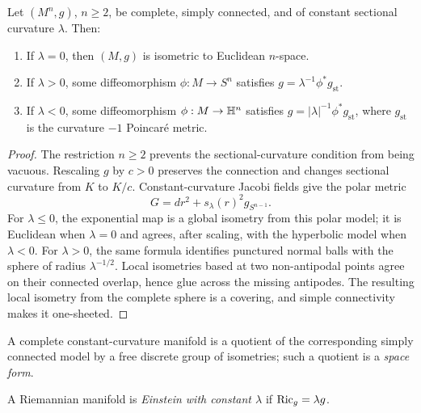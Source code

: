\begin{theorem}
\label{thm:uniformization}

Let $(M^n,g)$, $n\ge2$, be complete, simply connected, and of constant
sectional curvature $\lambda$. Then:
\begin{enumerate}
\item If $\lambda=0$, then $(M,g)$ is isometric to Euclidean
  $n$-space.
\item If $\lambda>0$, some diffeomorphism $\phi:M\to S^n$ satisfies
  $g=\lambda^{-1}\phi^*g_{\mathrm{st}}$.
\item If $\lambda<0$, some diffeomorphism $\phi:M\to\mathbb{H}^n$ satisfies
  $g=|\lambda|^{-1}\phi^*g_{\mathrm{st}}$, where
  $g_{\mathrm{st}}$ is the curvature $-1$ Poincar\'e metric.
\end{enumerate}
\end{theorem}

\begin{proof}
\sketch
{}
The restriction $n\ge2$ prevents the sectional-curvature condition from
being vacuous. Rescaling $g$ by $c>0$ preserves the connection and
changes sectional curvature from $K$ to $K/c$. Constant-curvature
Jacobi fields give the polar metric
\begin{equation}\label{modelpolar}
  G=dr^2+s_\lambda(r)^2g_{S^{n-1}}.
\end{equation}
For $\lambda\le0$, the exponential map is a global isometry from this
polar model; it is Euclidean when $\lambda=0$ and agrees, after scaling,
with the hyperbolic model when $\lambda<0$. For $\lambda>0$, the same
formula identifies punctured normal balls with the sphere of radius
$\lambda^{-1/2}$. Local isometries based at two non-antipodal points
agree on their connected overlap, hence glue across the missing
antipodes. The resulting local isometry from the complete sphere is a
covering, and simple connectivity makes it one-sheeted.
\end{proof}

A complete constant-curvature manifold is a quotient of the
corresponding simply connected model by a free discrete group of
isometries; such a quotient is a \emph{space form}.


\begin{definition}
\label{def:einstein-manifold}





A Riemannian manifold is \emph{Einstein with constant $\lambda$} if
$\operatorname{Ric}_g=\lambda g$.
\end{definition}

